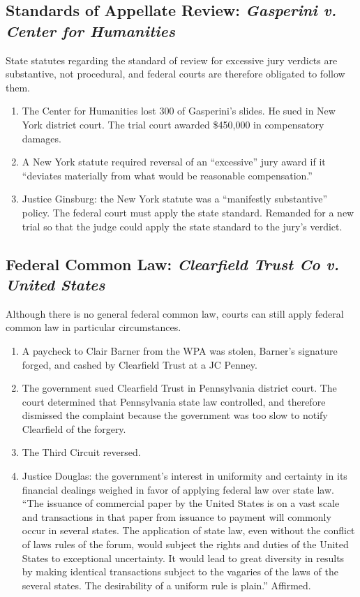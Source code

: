 \subsection{Standards of Appellate Review: \emph{Gasperini v. Center for 
Humanities}}

State statutes regarding the standard of review for excessive jury verdicts 
are substantive, not procedural, and federal courts are therefore obligated to 
follow them.

\begin{enumerate}
    \item The Center for Humanities lost 300 of Gasperini's slides. He sued in 
    New York district court. The trial court awarded \$450,000 in compensatory 
    damages.
    \item A New York statute required reversal of an ``excessive'' jury award 
    if it ``deviates materially from what would be reasonable compensation.''
    \item Justice Ginsburg: the New York statute was a ``manifestly 
    substantive'' policy. The federal court must apply the state standard.  
    Remanded for a new trial so that the judge could apply the state standard 
    to the jury's verdict.
\end{enumerate}

\subsection{Federal Common Law: \emph{Clearfield Trust Co v. United States}}

Although there is no general federal common law, courts can still apply 
federal common law in particular circumstances.

\begin{enumerate}
    \item A paycheck to Clair Barner from the WPA was stolen, Barner's 
    signature forged, and cashed by Clearfield Trust at a JC Penney.
    \item The government sued Clearfield Trust in Pennsylvania district court. 
    The court determined that Pennsylvania state law controlled, and therefore 
    dismissed the complaint because the government was too slow to notify 
    Clearfield of the forgery.
    \item The Third Circuit reversed.
    \item Justice Douglas: the government's interest in uniformity and 
    certainty in its financial dealings weighed in favor of applying federal 
    law over state law. ``The issuance of commercial paper by the United 
    States is on a vast scale and transactions in that paper from issuance to 
    payment will commonly occur in several states. The application of state 
    law, even without the conflict of laws rules of the forum, would subject 
    the rights and duties of the United States to exceptional uncertainty. It 
    would lead to great diversity in results by making identical transactions 
    subject to the vagaries of the laws of the several states. The 
    desirability of a uniform rule is plain.'' Affirmed.
\end{enumerate}

